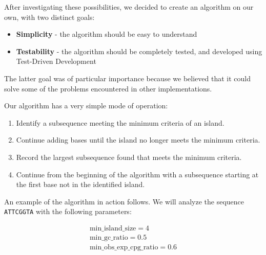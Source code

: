 \documentclass{bioinfo}
\newcommand{\dnaseq}[1]{\texttt{#1}}
\begin{document}
After investigating these possibilities, we decided to create an
algorithm on our own, with two distinct goals:

\begin{itemize}
\item \textbf{Simplicity} - the algorithm should be easy to understand
\item \textbf{Testability} - the algorithm should be completely tested, and
  developed using Test-Driven Development
\end{itemize}

The latter goal was of particular importance because we believed that
it could solve some of the problems encountered in other
implementations.

Our algorithm has a very simple mode of operation:

\begin{enumerate}
\item Identify a subsequence meeting the minimum criteria of an island.
\item Continue adding bases until the island no longer meets the
  minimum criteria.
\item Record the largest subsequence found that meets the minimum criteria.
\item Continue from the beginning of the algorithm with a subsequence
  starting at the first base not in the identified island.
\end{enumerate}

An example of the algorithm in action follows. We will analyze the
sequence \dnaseq{ATTCGGTA} with the following parameters:

\begin{eqnarray*}
  \mbox{min\_island\_size} = 4 \\
  \mbox{min\_gc\_ratio} = 0.5 \\
  \mbox{min\_obs\_exp\_cpg\_ratio} = 0.6 \\
\end{eqnarray*}
\end{document}
